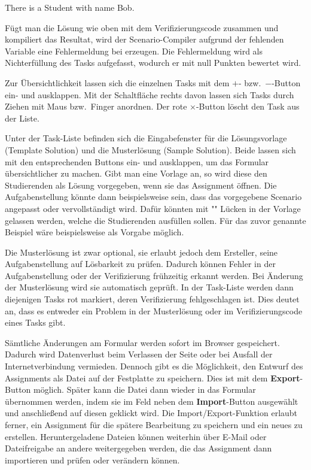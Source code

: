 \begin{mdcodeblock}
    There is a Student with name Bob.
\end{mdcodeblock}

Fügt man die Lösung wie oben mit dem Verifizierungscode zusammen und kompiliert das Resultat, wird der Scenario-Compiler aufgrund der fehlenden Variable  eine Fehlermeldung bei  erzeugen.
Die Fehlermeldung wird als Nichterfüllung des Tasks aufgefasst, wodurch er mit null Punkten bewertet wird.

Zur Übersichtlichkeit lassen sich die einzelnen Tasks mit dem \textbf{$+$}- bzw.\ \textbf{$-$}-Button ein- und ausklappen.
Mit der Schaltfläche rechts davon lassen sich Tasks durch Ziehen mit Maus bzw.\ Finger anordnen.
Der rote \textbf{$\times$}-Button löscht den Task aus der Liste.

Unter der Task-Liste befinden sich die Eingabefenster für die Lösungsvorlage (Template Solution) und die Musterlösung (Sample Solution).
Beide lassen sich mit den entsprechenden Buttons ein- und ausklappen, um das Formular übersichtlicher zu machen.
Gibt man eine Vorlage an, so wird diese den Studierenden als Lösung vorgegeben, wenn sie das Assignment öffnen.
Die Aufgabenstellung könnte dann beispielsweise sein, dass das vorgegebene Scenario angepasst oder vervollständigt wird.
Dafür könnten mit "" Lücken in der Vorlage gelassen werden, welche die Studierenden ausfüllen sollen.
Für das zuvor genannte Beispiel wäre beispielsweise  als Vorgabe möglich.

Die Musterlösung ist zwar optional, sie erlaubt jedoch dem Ersteller, seine Aufgabenstellung auf Lösbarkeit zu prüfen.
Dadurch können Fehler in der Aufgabenstellung oder der Verifizierung frühzeitig erkannt werden.
Bei Änderung der Musterlösung wird sie automatisch geprüft.
In der Task-Liste werden dann diejenigen Tasks rot markiert, deren Verifizierung fehlgeschlagen ist.
Dies deutet an, dass es entweder ein Problem in der Musterlösung oder im Verifizierungscode eines Tasks gibt.

Sämtliche Änderungen am Formular werden sofort im Browser gespeichert.
Dadurch wird Datenverlust beim Verlassen der Seite oder bei Ausfall der Internetverbindung vermieden.
Dennoch gibt es die Möglichkeit, den Entwurf des Assignments als Datei auf der Festplatte zu speichern.
Dies ist mit dem \textbf{Export}-Button möglich.
Später kann die Datei dann wieder in das Formular übernommen werden, indem sie im Feld neben dem \textbf{Import}-Button ausgewählt und anschließend auf diesen geklickt wird.
Die Import/Export-Funktion erlaubt ferner, ein Assignment für die spätere Bearbeitung zu speichern und ein neues zu erstellen.
Heruntergeladene Dateien können weiterhin über E-Mail oder Dateifreigabe an andere weitergegeben werden, die das Assignment dann importieren und prüfen oder verändern können.

